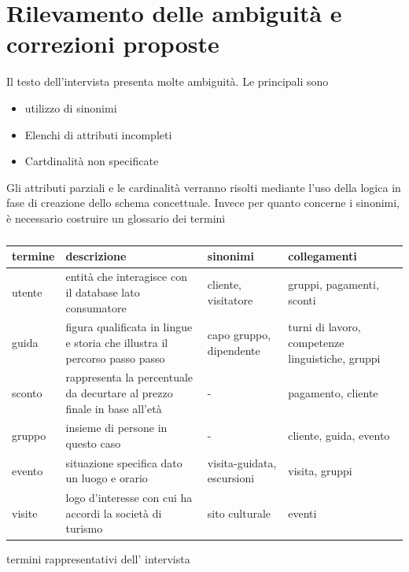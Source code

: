 \documentclass[a4paper,12pt]{report}
\begin{document}
\section{Rilevamento delle ambiguità e correzioni proposte}
Il testo dell'intervista presenta molte ambiguità. Le principali sono
\begin{itemize}
	\item utilizzo di sinonimi
	\item Elenchi di attributi incompleti
	\item Cartdinalità non specificate
\end{itemize}

Gli attributi parziali e le cardinalità verranno risolti mediante l'uso della logica in fase di creazione dello schema concettuale.
Invece per quanto concerne i sinonimi, è necessario costruire un glossario dei termini


\begin{table}[H]
	\begin{center}
		\begin{tabularx}{\textwidth}{|>{\centering\arraybackslash}X|>{\centering\arraybackslash}X|>{\centering\arraybackslash}X|>{\centering\arraybackslash}X|}
			\hline
			\rowcolor{red} termine & descrizione                                                                & sinonimi                   & collegamenti                                     \\
			\hline
			utente                 & entità che interagisce con il database lato consumatore                    & cliente, visitatore        & gruppi, pagamenti, sconti                        \\
			\hline
			guida                  & figura qualificata in lingue e storia che illustra il percorso passo passo & capo gruppo, dipendente    & turni di lavoro, competenze linguistiche, gruppi \\
			\hline
			sconto                 & rappresenta la percentuale da decurtare al prezzo finale in base all'età   & -                          & pagamento, cliente                               \\
			\hline
			gruppo                 & insieme di persone in questo caso                                          & -                          & cliente, guida, evento                           \\
			\hline
			evento                 & situazione specifica dato un luogo e orario                                & visita-guidata, escursioni & visita, gruppi                                   \\
			\hline
			visite                 & logo d'interesse con cui ha accordi la società di turismo                  & sito culturale             & eventi                                           \\
			\hline
		\end{tabularx}
		\caption{\label{glossario:termini}} termini rappresentativi dell' intervista
	\end{center}
\end{table}
\end{document}
